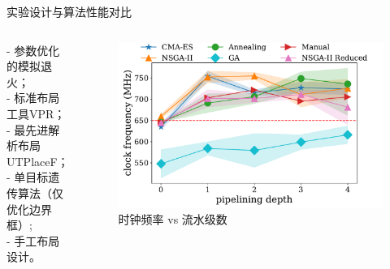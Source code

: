 \documentclass[10pt]{beamer}
\begin{document}
\begin{frame}{实验设计与算法性能对比}
  
  \begin{columns}[T, onlytextwidth]


    {\fontsize{7}{12}\selectfont
      - 参数优化的模拟退火；\\
      - 标准布局工具VPR；\\
      - 最先进解析布局UTPlaceF；\\
      - 单目标遗传算法（仅优化边界框）;\\
      - 手工布局设计。\\
    
    }

    \begin{figure}
      \includegraphics[width=\textwidth]{img/frequency_depth}
      \caption{时钟频率 vs 流水级数}
    \end{figure}


\end{columns}
\end{frame}
\end{document}
